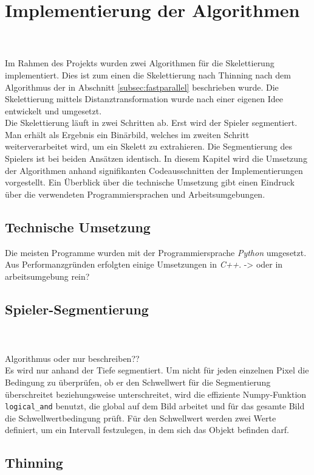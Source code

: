 \chapter{Implementierung der Algorithmen}
\\\\
Im Rahmen des Projekts wurden zwei Algorithmen für die Skelettierung implementiert. Dies ist zum einen
die Skelettierung nach Thinning nach dem Algorithmus der in Abschnitt \ref{subsec:fastparallel} beschrieben wurde. Die Skelettierung mittels Distanztransformation wurde nach einer eigenen Idee entwickelt und
umgesetzt.\\
Die Skelettierung läuft in zwei Schritten ab. Erst wird der Spieler segmentiert. Man erhält als
Ergebnis ein Binärbild, welches im zweiten Schritt weiterverarbeitet wird, um ein Skelett zu extrahieren. 
Die Segmentierung des Spielers ist bei beiden Ansätzen identisch.
In diesem Kapitel wird die Umsetzung der Algorithmen anhand signifikanten Codeausschnitten der Implementierungen vorgestellt. Ein Überblick über die technische Umsetzung gibt einen Eindruck über die
verwendeten Programmiersprachen und Arbeitsumgebungen.
\section{Technische Umsetzung}
Die meisten Programme wurden mit der Programmiersprache \emph{Python} umgesetzt. Aus Performanzgründen 
erfolgten einige Umsetzungen in \emph{C++}. -> oder in arbeitsumgebung rein?\\
\section{Spieler-Segmentierung}
\\\\
Algorithmus oder nur beschreiben??\\
Es wird nur anhand der Tiefe segmentiert. Um nicht für jeden einzelnen Pixel die Bedingung zu überprüfen, ob er den Schwellwert für die Segmentierung überschreitet beziehungsweise unterschreitet, wird die effiziente Numpy-Funktion \texttt{logical\_and} benutzt, die global auf dem Bild arbeitet und für das gesamte Bild die Schwellwertbedingung prüft. Für den Schwellwert werden zwei 
Werte definiert, um ein Intervall festzulegen, in dem sich das Objekt befinden darf. 
\section{Thinning}  %
